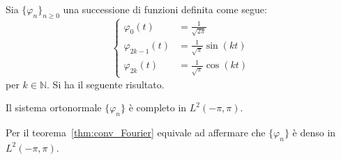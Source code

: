 Sia \(\{\varphi_n\}_{n\ge 0}\) una successione di funzioni definita come segue:
\[
\begin{cases}
    \varphi_0 (t) &= \frac{1}{\sqrt{2 \pi}} \\
    \varphi_{2k-1} (t) &= \frac{1}{\sqrt \pi} \sin(kt) \\
    \varphi_{2k}(t) &= \frac{1}{\sqrt \pi} \cos(kt)
\end{cases}
\]
per \(k \in \mathbb N\). Si ha il seguente risultato.

\begin{proposition}
    Il sistema ortonormale \(\{\varphi_n\}\) è completo in \(L^2(-\pi, \pi)\).
\end{proposition}

\begin{remark}
    Per il teorema~\ref{thm:conv_Fourier} equivale ad affermare che \(\{\varphi_n\}\) è
    denso in \(L^2(-\pi, \pi)\).
\end{remark}

